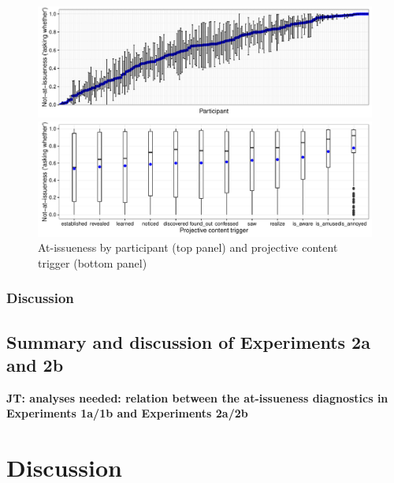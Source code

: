 \documentclass[11pt,fleqn]{article}
\newcommand{\6}{\mbox{$[\hspace*{-.6mm}[$}}
\newcommand{\9}{\mbox{$]\hspace*{-.6mm}]$}}
\newcommand{\jt}[1]{\textbf{\color{blue}JT: #1}}
\begin{document}
\begin{figure}[!h]
\begin{center}

\includegraphics[width=16cm]{../results/exp2b/graphs/ai-subjectmeans}

\includegraphics[width=16cm]{../results/exp2b/graphs/boxplot-not-at-issueness}

\end{center}
\caption{At-issueness by participant (top panel) and projective content trigger (bottom panel)}
\label{f-ai-2b}
\end{figure}

\subsubsection{Discussion}

\subsection{Summary and discussion of Experiments 2a and 2b}

\jt{analyses needed: relation between the at-issueness diagnostics in Experiments 1a/1b and Experiments 2a/2b}

\section{Discussion}\label{s5}
\end{document}
